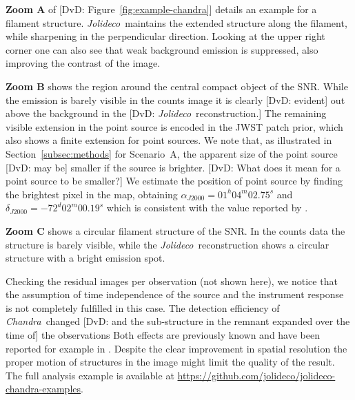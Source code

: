 \documentclass[twocolumn]{aastex631}
\newcommand{\chandra}{\textit{Chandra}~}
\newcommand{\jolideco}{\textit{Jolideco}~}
\newcommand{\jolideconospace}{\textit{Jolideco}}
\newcommand{\dvd}[1]{{\color{red} [DvD: #1]}}
\begin{document}
    
    \textbf{Zoom A} of \dvd{Figure~\ref{fig:example-chandra}} details an example for a filament structure. \jolideco maintains the extended structure along the filament, while sharpening in the perpendicular direction. Looking at the upper right corner one can also see that weak background emission is suppressed, also improving the contrast of the image.
    
    \textbf{Zoom B} shows the region around the central compact object of the SNR. While the emission is barely visible in the counts image it is clearly \dvd{evident}
    out above the background in the \dvd{\jolideco reconstruction.} %
    The remaining visible extension in the point source is encoded in the JWST patch prior, which also shows a finite extension for point sources. We note that, as illustrated in Section~\ref{subsec:methods} for Scenario~A, the apparent size of the point source \dvd{may be} %
    smaller if the source is brighter. \dvd{What does it mean for a point source to be smaller?} We estimate the position of point source by finding the brightest pixel in the map, obtaining $\alpha_{J2000}=01^h04^m02.75^s$ and $\delta_{J2000}=-72^d02^m00.19^s$ which is consistent with the value reported by \cite{Long2020}.
    
    \textbf{Zoom C} shows a circular filament structure of the SNR. In the counts data the structure is barely visible, while the \jolideco reconstruction %
    shows a circular structure with a bright emission spot. 

    Checking the residual images per observation (not shown here), we notice that the assumption of time independence of the source and the instrument response is not completely fulfilled in this case. %
    The detection efficiency of \chandra changed 
    \dvd{and the sub-structure in the remnant expanded over the time of} %
    the observations 
    Both effects are previously known and have been reported for example in \cite{Xi2019}. Despite the clear improvement in spatial resolution the proper motion of structures in the image might limit the quality of the result. The full analysis example is available at \url{https://github.com/jolideco/jolideco-chandra-examples}.
\end{document}
